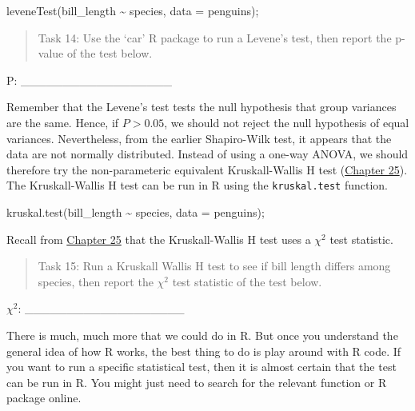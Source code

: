 \documentclass[
]{scrbook}
\newenvironment{Shaded}{\begin{snugshade}}{\end{snugshade}}
\newcommand{\AttributeTok}[1]{\textcolor[rgb]{0.77,0.63,0.00}{#1}}
\newcommand{\FunctionTok}[1]{\textcolor[rgb]{0.00,0.00,0.00}{#1}}
\newcommand{\NormalTok}[1]{#1}
\newcommand{\SpecialCharTok}[1]{\textcolor[rgb]{0.00,0.00,0.00}{#1}}
\begin{document}
\begin{Shaded}
\begin{Highlighting}[]
\FunctionTok{leveneTest}\NormalTok{(bill\_length }\SpecialCharTok{\textasciitilde{}}\NormalTok{ species, }\AttributeTok{data =}\NormalTok{ penguins);}
\end{Highlighting}
\end{Shaded}

\begin{quote}
Task 14: Use the `car' R package to run a Levene's test, then report the p-value of the test below.
\end{quote}

P: \_\_\_\_\_\_\_\_\_\_\_\_\_\_\_\_\_\_

Remember that the Levene's test tests the null hypothesis that group variances are the same.
Hence, if \(P > 0.05\), we should not reject the null hypothesis of equal variances.
Nevertheless, from the earlier Shapiro-Wilk test, it appears that the data are not normally distributed.
Instead of using a one-way ANOVA, we should therefore try the non-parameteric equivalent Kruskall-Wallis H test (\protect\hyperlink{Chapter_25}{Chapter 25}).
The Kruskall-Wallis H test can be run in R using the \texttt{kruskal.test} function.

\begin{Shaded}
\begin{Highlighting}[]
\FunctionTok{kruskal.test}\NormalTok{(bill\_length }\SpecialCharTok{\textasciitilde{}}\NormalTok{ species, }\AttributeTok{data =}\NormalTok{ penguins);}
\end{Highlighting}
\end{Shaded}

Recall from \protect\hyperlink{Chapter_25}{Chapter 25} that the Kruskall-Wallis H test uses a \(\chi^{2}\) test statistic.

\begin{quote}
Task 15: Run a Kruskall Wallis H test to see if bill length differs among species, then report the \(\chi^{2}\) test statistic of the test below.
\end{quote}

\(\chi^{2}\): \_\_\_\_\_\_\_\_\_\_\_\_\_\_\_\_\_\_\_

There is much, much more that we could do in R.
But once you understand the general idea of how R works, the best thing to do is play around with R code.
If you want to run a specific statistical test, then it is almost certain that the test can be run in R.
You might just need to search for the relevant function or R package online.
\end{document}
